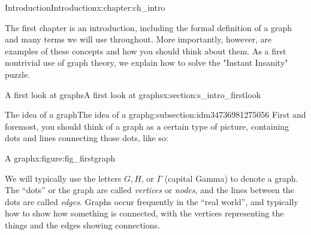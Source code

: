\documentclass[oneside,10pt,]{book}
\numberwithin{equation}{section}
\begin{document}
\frontmatter
\setcounter{tocdepth}{1}
\renewcommand*\contentsname{Contents}
\tableofcontents
\mainmatter
%
%
\typeout{************************************************}
\typeout{************************************************}
%
\begin{chapterptx}{Introduction}{}{Introduction}{}{}{x:chapter:ch_intro}
\begin{introduction}{}%
The first chapter is an introduction, including the formal definition of a graph and many terms we will use throughout.  More importantly, however, are examples of these concepts and how you should think about them.  As a first nontrivial use of graph theory, we explain how to solve the "Instant Insanity" puzzle.%
\end{introduction}%
%
%
\typeout{************************************************}
\typeout{************************************************}
%
\begin{sectionptx}{A first look at graphs}{}{A first look at graphs}{}{}{x:section:s_intro_firstlook}
%
%
\typeout{************************************************}
\typeout{************************************************}
%
\begin{subsectionptx}{The idea of a graph}{}{The idea of a graph}{}{}{g:subsection:idm34736981275056}
First and foremost, you should think of a graph as a certain type of picture, containing dots and lines connecting those dots, like so:%
\begin{figureptx}{A graph}{x:figure:fig_firstgraph}{}%
\begin{image}{0.1}{0.8}{0.1}%
%
\end{image}%
\tcblower
\end{figureptx}%
We will typically use the letters \(G, H\), or \(\Gamma\) (capital Gamma) to denote a graph.  The ``dots'' or the graph are called \emph{vertices} or \emph{nodes}, and the lines between the dots are called \emph{edges}. Graphs occur frequently in the ``real world'', and typically how to show how something is connected, with the vertices representing the things and the edges showing connections.%

\end{subsectionptx}
\end{sectionptx}
\end{chapterptx}
\end{document}
